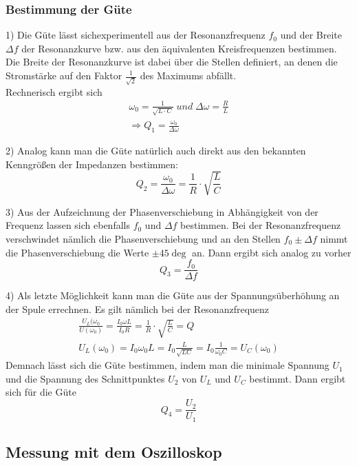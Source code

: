 \documentclass[a4paper, 11pt]{article}
\begin{document}
\subsubsection{Bestimmung der Güte}
1) Die Güte lässt sichexperimentell aus der Resonanzfrequenz $f_0$ und der Breite $\Delta f$ der Resonanzkurve bzw. aus den äquivalenten Kreisfrequenzen bestimmen. Die Breite der Resonanzkurve ist dabei über die Stellen definiert, an denen die Stromstärke auf den Faktor $\frac{1}{\sqrt{2}}$ des Maximums abfällt.\\
Rechnerisch ergibt sich 
\begin{eqnarray}
\omega_0 = \frac{1}{\sqrt{L \cdot C}} \; und \; \Delta \omega = \frac{R}{L} \\
\Rightarrow Q_1 = \frac{\omega_0}{\Delta \omega}
\end{eqnarray} 

2) Analog kann man die Güte natürlich auch direkt aus den bekannten Kenngrößen der Impedanzen bestimmen:
\begin{equation}
Q_2 = \frac{\omega_0}{\Delta \omega} = \frac{1}{R} \cdot \sqrt{\frac{L}{C}}
\end{equation}

3) Aus der Aufzeichnung der Phasenverschiebung in Abhängigkeit von der Frequenz lassen sich ebenfalls $f_0$ und $\Delta f$ bestimmen. Bei der Resonanzfrequenz verschwindet nämlich die Phasenverschiebung und an den Stellen $f_0 \pm \Delta f$ nimmt die Phasenverschiebung die Werte $\pm 45 \deg$ an. Dann ergibt sich analog zu vorher 
\begin{equation}
Q_3 = \frac{f_0}{\Delta f}
\end{equation}

4) Als letzte Möglichkeit kann man die Güte aus der Spannungsüberhöhung an der Spule errechnen. Es gilt nämlich bei der Resonanzfrequenz 
\begin{eqnarray}
\frac{U_L(\omega_0}{U(\omega_0)} = \frac{I_0 \omega L}{I_0 R} = \frac{1}{R} \cdot \sqrt{\frac{L}{C}} = Q \\
U_L(\omega_0) = I_0 \omega_0 L = I_0 \frac{L}{\sqrt{LC}} = I_0 \frac{1}{\omega_0 C} = U_C(\omega_0)
\end{eqnarray}
Demnach lässt sich die Güte bestimmen, indem man die minimale Spannung $U_1$ und die Spannung des Schnittpunktes $U_2$ von $U_L$ und $U_C$ bestimmt. Dann ergibt sich für die Güte 
\begin{equation}
Q_4 = \frac{U_2}{U_1}
\end{equation}

\subsection{Messung mit dem Oszilloskop}
\end{document}
